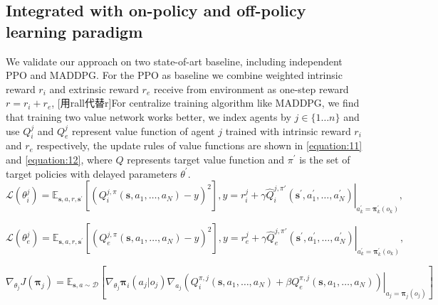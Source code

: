 \documentclass{article} %
\begin{document}
\subsection{Integrated with on-policy and off-policy learning paradigm}
We validate our approach on two state-of-art baseline, including independent PPO and MADDPG. For the PPO as baseline we combine weighted intrinsic reward $r_{i}$ and extrinsic reward $r_{e}$ receive from environment as one-step reward $r=r_{i}+r_{e}$, [用rall代替r]For centralize training algorithm like MADDPG, we find that training two value network works better, we index agents by $j \in\{1 \ldots n\}$ and use $Q_{i}^{j}$ and $Q_{e}^{j}$ represent value function of agent $j$ trained with intrinsic reward $r_{i}$ and $r_{e}$ respectively, the update rules of value functions are shown in \ref{equation:11} and \ref{equation:12}, where $\hat{Q}$ represents target value function and $\pi^{\prime}$ is the set of target policies with delayed parameters $\theta^{\prime}$.
\begin{equation}
\label{equation:11}
\mathcal{L}\left(\theta_{i}^{j}\right)=\mathbb{E}_{\mathbf{s}, a, r, \mathbf{s}^{\prime}}\left[\left(Q_{i}^{j,\pi}\left(\mathbf{s}, a_{1}, \ldots, a_{N}\right)-y\right)^{2}\right], y=r_{i}^{j}+\left.\gamma \hat{Q}_{i}^{j,{\pi}{\prime}}\left(\mathbf{s}^{\prime}, a_{1}^{\prime}, \ldots, a_{N}^{\prime}\right)\right|_{a_{k}^{\prime}=\boldsymbol{\pi}_{k}^{\prime}\left(o_{k}\right)},
\end{equation}

\begin{equation}
\label{equation:12}
\mathcal{L}\left(\theta_{e}^{j}\right)=\mathbb{E}_{\mathbf{s}, a, r, \mathbf{s}^{\prime}}\left[\left(Q_{e}^{j,\pi}\left(\mathbf{s}, a_{1}, \ldots, a_{N}\right)-y\right)^{2}\right], y=r_{e}^{j}+\left.\gamma \hat{Q}_{e}^{j,{\pi}{\prime}}\left(\mathbf{s}^{\prime}, a_{1}^{\prime}, \ldots, a_{N}^{\prime}\right)\right|_{a_{k}^{\prime}=\boldsymbol{\pi}_{k}^{\prime}\left(o_{k}\right)},
\end{equation}

\begin{equation}
\label{equation:13}
\nabla_{\theta_{j}} J\left(\boldsymbol{\pi}_{j}\right)=\mathbb{E}_{\mathbf{s}, a \sim \mathcal{D}}\left[\left.\nabla_{\theta_{j}} \boldsymbol{\pi}_{i}\left(a_{j} | o_{j}\right) \nabla_{a_{j}} \left(Q_{i}^{\pi,j}\left(\mathbf{s}, a_{1}, \ldots, a_{N}\right)+\beta Q_{e}^{\pi,j}\left(\mathbf{s}, a_{1}, \ldots, a_{N}\right)     \right)\right|_{a_{j}=\boldsymbol{\pi}_{j}\left(o_{j}\right)}\right]
\end{equation}
\end{document}
